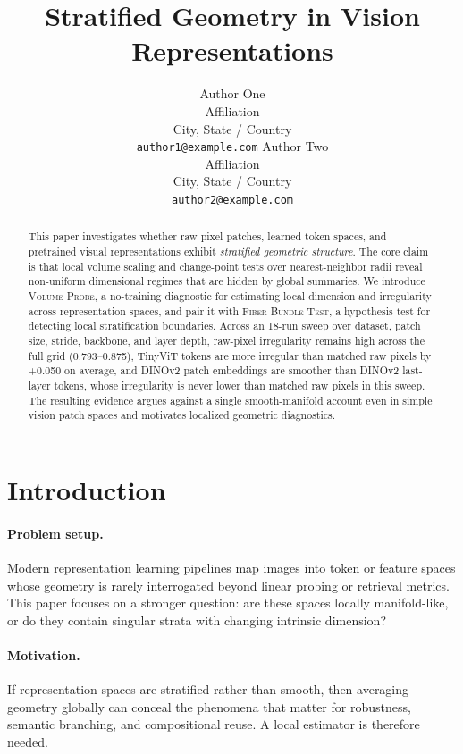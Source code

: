 \documentclass{article}
\title{Stratified Geometry in Vision Representations}
\author{
  Author One \\
  Affiliation \\
  City, State / Country \\
  \texttt{author1@example.com}
  \And
  Author Two \\
  Affiliation \\
  City, State / Country \\
  \texttt{author2@example.com}
}
\newcommand{\method}{\textsc{Volume Probe}}
\newcommand{\fiber}{\textsc{Fiber Bundle Test}}
\theoremstyle{definition}
\theoremstyle{plain}
\theoremstyle{remark}
\begin{document}
\maketitle

\begin{abstract}
This paper investigates whether raw pixel patches, learned token spaces, and pretrained visual representations exhibit \emph{stratified geometric structure}. The core claim is that local volume scaling and change-point tests over nearest-neighbor radii reveal non-uniform dimensional regimes that are hidden by global summaries. We introduce \method, a no-training diagnostic for estimating local dimension and irregularity across representation spaces, and pair it with \fiber, a hypothesis test for detecting local stratification boundaries. Across an 18-run sweep over dataset, patch size, stride, backbone, and layer depth, raw-pixel irregularity remains high across the full grid (0.793--0.875), TinyViT tokens are more irregular than matched raw pixels by +0.050 on average, and DINOv2 patch embeddings are smoother than DINOv2 last-layer tokens, whose irregularity is never lower than matched raw pixels in this sweep. The resulting evidence argues against a single smooth-manifold account even in simple vision patch spaces and motivates localized geometric diagnostics.
\end{abstract}

\section{Introduction}
\paragraph{Problem setup.}
Modern representation learning pipelines map images into token or feature spaces whose geometry is rarely interrogated beyond linear probing or retrieval metrics. This paper focuses on a stronger question: are these spaces locally manifold-like, or do they contain singular strata with changing intrinsic dimension?

\paragraph{Motivation.}
If representation spaces are stratified rather than smooth, then averaging geometry globally can conceal the phenomena that matter for robustness, semantic branching, and compositional reuse. A local estimator is therefore needed.
\end{document}
